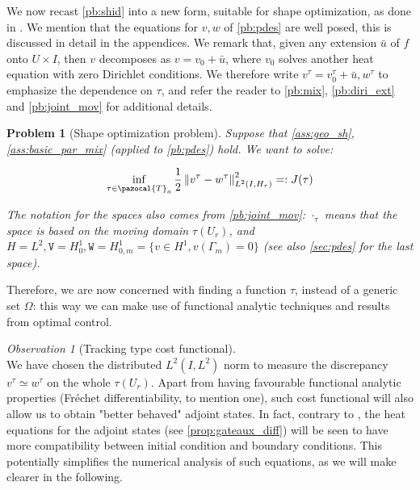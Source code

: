 \documentclass[english,a4paper,9pt,oneside]{scrbook}	%
\theoremstyle{break}
\newtheorem{pb}[equation]{Problem}
\theoremstyle{remark}
\newtheorem{obs}[equation]{Observation}
\newcommand{\norm}[1]{\left\lVert#1\right\rVert}
\newcommand{\cT}{\pazocal{T}}
\newcommand{\tw}[1]{\texttt{#1}}
\begin{document}

We now recast \cref{pb:shid} into a new form, suitable for shape optimization, as done in \cite{harbrecht}. We mention that the equations for $v,w$ of \cref{pb:pdes} are well posed, this is discussed in detail in the appendices. We remark that, given any extension $\bar{u}$ of $f$ onto $U\times I$, then $v$ decomposes as $v = v_0+\bar{u}$, where $v_0$ solves another heat equation with zero Dirichlet conditions. We therefore write $v^\tau = v_0^\tau + \bar{u}, w^\tau$ to emphasize the dependence on $\tau$, and refer the reader to \cref{pb:mix}, \cref{pb:diri_ext} and \cref{pb:joint_mov} for additional details. 

\begin{pb}[Shape optimization problem]
\label{pb:shopt}
Suppose that \cref{ass:geo_sh}, \cref{ass:basic_par_mix} (applied to \cref{pb:pdes}) hold. We want to solve:

$$\inf_{\tau \in \cT_a}\frac{1}{2}\norm{v^\tau-w^\tau}_{L^2(I,H_\tau)}^2=:J(\tau)$$

The notation for the spaces also comes from  \cref{pb:joint_mov}: $\cdot_\tau$ means that the space is based on the moving domain $\tau(U_r)$, and $H=L^2, \tw{V}=H^1_0, \tw{W} = H^1_{0,m}=\{v \in H^1, v(\Gamma_m)=0\}$ (see also \cref{sec:pdes} for the last space).

\end{pb}

Therefore, we are now concerned with finding a function $\tau$, instead of a generic set $\Omega$: this way we can make use of functional analytic techniques and results from optimal control.



\begin{obs}[Tracking type cost functional]
\mbox{}\\
We have chosen the distributed $L^2(I,L^2)$ norm to measure the discrepancy $v^\tau\simeq w^\tau$ on the whole $\tau(U_r)$. Apart from having favourable functional analytic properties (Fréchet differentiability, to mention one), such cost functional will also allow us to obtain "better behaved" adjoint states. In fact, contrary to \cite{harbrecht}, the heat equations for the adjoint states (see \cref{prop:gateaux_diff}) will be seen to have more compatibility between initial condition and boundary conditions. This potentially simplifies the numerical analysis of such equations, as we will make clearer in the following.
\end{obs}
\end{document}
